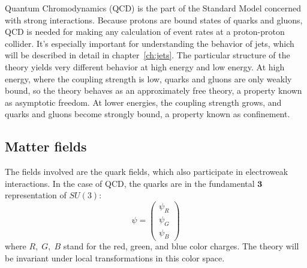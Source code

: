 Quantum Chromodynamics (QCD) is the part of the Standard Model concerned with strong interactions.
Because protons are bound states of quarks and gluons, QCD is needed for making any calculation of event rates at a proton-proton collider.
It's especially important for understanding the behavior of jets, which will be described in detail in chapter~\ref{ch:jets}.
The particular structure of the theory yields very different behavior at high energy and low energy.
At high energy, where the coupling strength is low, quarks and gluons are only weakly bound, so the theory behaves as an approximately free theory, a property known as asymptotic freedom.
At lower energies, the coupling strength grows, and quarks and gluons become strongly bound, a property known as confinement.

\subsection{Matter fields}\label{subsec:matter fields}

The fields involved are the quark fields, which also participate in electroweak interactions.
In the case of QCD, the quarks are in the fundamental $\boldsymbol{3}$ representation of $SU(3)$:
\begin{equation}\label{eq:qcd-fields}
    \psi = \begin{pmatrix}\psi_R \\ \psi_G \\ \psi_B \end{pmatrix}
\end{equation}
where $R,\;G,\;B$ stand for the red, green, and blue color charges.
The theory will be invariant under local transformations in this color space.

